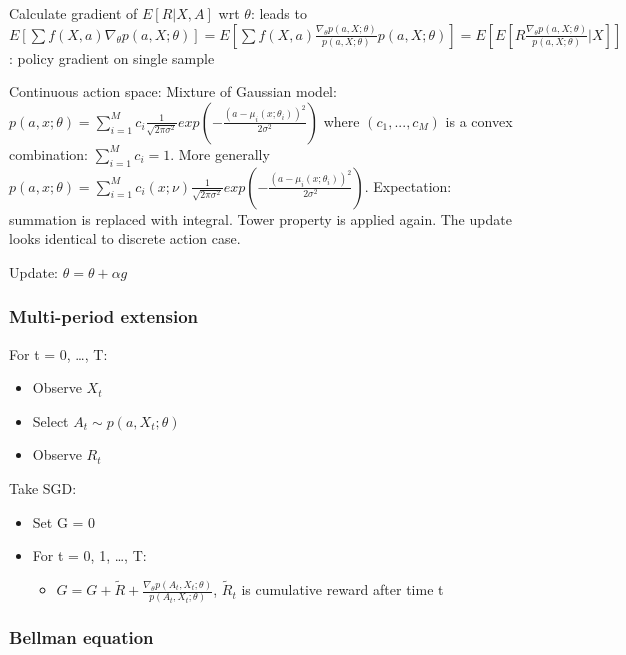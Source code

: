 \documentclass[]{article}
\providecommand{\tightlist}{%
  \setlength{\itemsep}{0pt}\setlength{\parskip}{0pt}}
\begin{document}
Calculate gradient of \(E[R | X, A]\) wrt \(\theta\): leads to
\(E[\sum f(X,a)\nabla_\theta p(a, X; \theta)] = E[\sum f(X,a) \frac{\nabla_\theta p(a, X; \theta)}{p(a, X; \theta)}p(a, X; \theta)] = E[E[R \frac{\nabla_\theta p(a, X; \theta)}{p(a, X; \theta)}| X]]\):
policy gradient on single sample

Continuous action space: Mixture of Gaussian model:
\(p(a, x; \theta) = \sum_{i=1}^{M} c_i\frac{1}{\sqrt{2\pi \sigma^2}}exp(-\frac{(a-\mu_i(x; \theta_i))^2}{2\sigma^2})\)
where \((c_1, ..., c_M)\) is a convex combination:
\(\sum_{i=1}^{M} c_i = 1\). More generally
\(p(a, x; \theta) = \sum_{i=1}^{M} c_i(x; \nu)\frac{1}{\sqrt{2\pi \sigma^2}}exp(-\frac{(a-\mu_i(x; \theta_i))^2}{2\sigma^2})\).
Expectation: summation is replaced with integral. Tower property is
applied again. The update looks identical to discrete action case.

Update: \(\theta = \theta + \alpha g\)

\hypertarget{multi-period-extension}{%
\subsubsection{Multi-period extension}\label{multi-period-extension}}

For t = 0, \ldots{}, T:

\begin{itemize}
\tightlist
\item
  Observe \(X_t\)
\item
  Select \(A_t \sim p(a, X_t;\theta)\)
\item
  Observe \(R_t\)
\end{itemize}

Take SGD:

\begin{itemize}
\tightlist
\item
  Set G = 0
\item
  For t = 0, 1, \ldots{}, T:

  \begin{itemize}
  \tightlist
  \item
    \(G = G + \tilde R + \frac{\nabla_\theta p(A_t, X_t; \theta)}{p(A_t, X_t; \theta)}\),
    \(\tilde R_t\) is cumulative reward after time t
  \end{itemize}
\end{itemize}

\hypertarget{bellman-equation}{%
\subsubsection{Bellman equation}\label{bellman-equation}}
\end{document}
